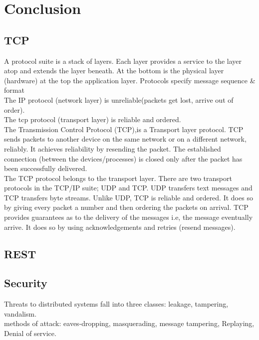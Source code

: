 \chapter{Conclusion}
\minitoc
\section{TCP}

A protocol suite is a stack of layers. Each layer provides a service to the layer atop and extends the layer beneath. At the bottom is the physical layer (hardware) at the top the application layer. Protocols specify message sequence \& format\\

The IP protocol (network layer) is unreliable(packets get lost, arrive out of order).\\
The tcp protocol (transport layer) is reliable and ordered. \\

The Transmission Control Protocol (TCP),is a Transport layer protocol. TCP sends packets to another device on the same network or on a different network, reliably. It achieves reliability by resending the packet. The established connection (between the devices/processes) is closed only after the packet has been successfully delivered.\\

The TCP protocol belongs to the transport layer. There are two transport protocols in the TCP/IP suite; UDP and TCP. UDP transfers text messages and TCP transfers byte streams. Unlike UDP, TCP is reliable and ordered. It does so by giving every packet a number and then ordering the packets on arrival. TCP provides guarantees as to the delivery of the messages i.e, the message eventually arrive. It does so by using acknowledgements and retries (resend messages).   \\

  



\section{REST}
\section{Security}
Threats to distributed systems fall into three classes: leakage, tampering, vandalism.\\
 
methods of attack: eaves-dropping, masquerading, message tampering, Replaying, Denial of service.\\

